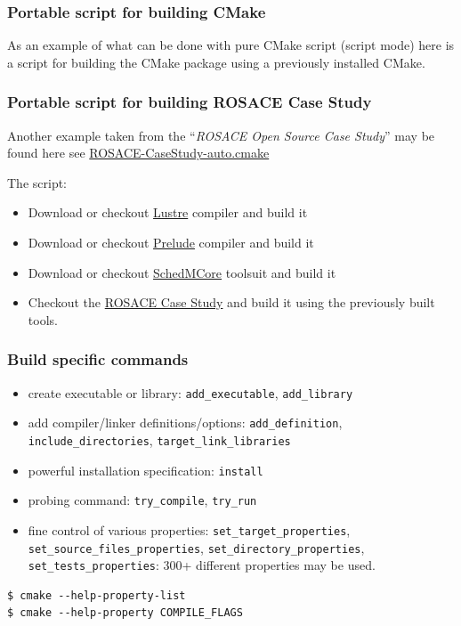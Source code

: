 \documentclass[compress,slidestop,table,usepdftitle=false
              ]
               {beamer}
\begin{document}
\begin{frame}
\frametitle{Portable script for building CMake}
As an example of what can be done with pure CMake script
(script mode) here is a script for building the CMake package
using a previously installed CMake.


\end{frame}

\begin{frame}[fragile]
  \frametitle{Portable script for building ROSACE Case Study}
Another example taken from the ``\emph{ROSACE Open Source Case Study}'' may be found here
see \href{https://svn.onera.fr/schedmcore/branches/ROSACE_CaseStudy/prelude_implementations/instructions/ROSACE-CaseStudy-auto.cmake}{ROSACE-CaseStudy-auto.cmake}

The script:
\begin{itemize}
\item Download or checkout \href{https://cavale.enseeiht.fr/redmine/projects/lustrec}{Lustre} compiler and build it
\item Download or checkout \href{https://forge.onera.fr/projects/prelude}{Prelude} compiler and build it
\item Download or checkout \href{http://sites.onera.fr/schedmcore/}{SchedMCore} toolsuit and build it
\item Checkout the \href{http://sites.onera.fr/schedmcore/ROSACE}{ROSACE Case Study} and build it using the previously built tools.
\end{itemize}
\end{frame}

\begin{frame}[fragile]
\frametitle{Build specific commands}
\begin{itemize}
\item create executable or library: \lstinline!add_executable!, \lstinline!add_library!
\item add compiler/linker definitions/options: \lstinline!add_definition!, \lstinline!include_directories!,
      \lstinline!target_link_libraries!
\item powerful installation specification: \lstinline!install!
\item probing command: \lstinline!try_compile!, \lstinline!try_run!
\item fine control of various properties:
      \lstinline!set_target_properties!,
      \lstinline!set_source_files_properties!,
      \lstinline!set_directory_properties!,
      \lstinline!set_tests_properties!: \alert{300+} different properties may be used.
\end{itemize}
\begin{Verbatim}
$ cmake --help-property-list
$ cmake --help-property COMPILE_FLAGS
\end{Verbatim}
\end{frame}
\end{document}
